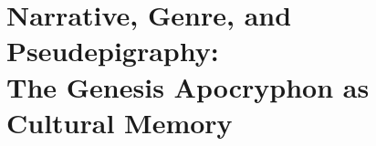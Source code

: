 
\chapter{Narrative, Genre, and Pseudepigraphy:\protect\\The Genesis Apocryphon as Cultural Memory}





